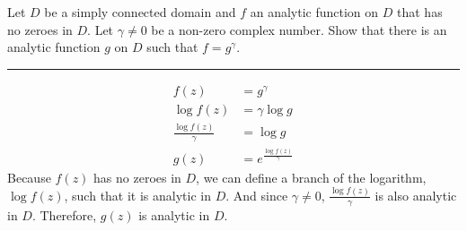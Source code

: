 \begin{example}

    Let \( D \) be a simply connected domain and \( f \) an analytic function on \( D \) that has no zeroes in \( D \). Let \( \gamma \neq 0 \) be a non-zero complex number. Show that there is an analytic function \( g \) on \( D \) such that \( f = g^{\gamma} \).

    \hrule
    \vspace{0.5cm}

    \begin{align*}
        f(z)                     & = g^{\gamma}                   \\
        \log f(z)                & = \gamma \log g                \\
        \frac{\log f(z)}{\gamma} & = \log g                       \\
        g(z)                     & = e^{\frac{\log f(z)}{\gamma}}
    \end{align*}
    Because $f(z)$ has no zeroes in $D$, we can define a branch of the logarithm, $\log f(z)$, such that it is analytic in $D$. And since $\gamma \neq 0$, $\frac{\log f(z)}{\gamma}$ is also analytic in $D$. Therefore, $g(z)$ is analytic in $D$.
\end{example}

